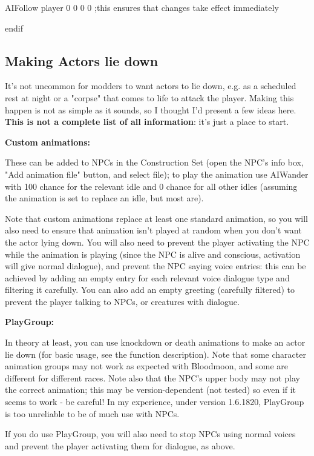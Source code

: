 \documentclass[
]{article}
\begin{document}
AIFollow player 0 0 0 0 ;this ensures that changes take effect
immediately

endif

\hypertarget{making-actors-lie-down}{%
\subsection{Making Actors lie down}\label{making-actors-lie-down}}

It's not uncommon for modders to want actors to lie down, e.g. as a
scheduled rest at night or a "corpse" that comes to life to attack the
player. Making this happen is not as simple as it sounds, so I thought
I'd present a few ideas here. \textbf{This is not a complete list of all
information}: it's just a place to start.

\textbf{Custom animations:}

These can be added to NPCs in the Construction Set (open the NPC's info
box, "Add animation file" button, and select file); to play the
animation use AIWander with 100 chance for the relevant idle and 0
chance for all other idles (assuming the animation is set to replace an
idle, but most are).

Note that custom animations replace at least one standard animation, so
you will also need to ensure that animation isn't played at random when
you don't want the actor lying down. You will also need to prevent the
player activating the NPC while the animation is playing (since the NPC
is alive and conscious, activation will give normal dialogue), and
prevent the NPC saying voice entries: this can be achieved by adding an
empty entry for each relevant voice dialogue type and filtering it
carefully. You can also add an empty greeting (carefully filtered) to
prevent the player talking to NPCs, or creatures with dialogue.

\textbf{PlayGroup:}

In theory at least, you can use knockdown or death animations to make an
actor lie down (for basic usage, see the function description). Note
that some character animation groups may not work as expected with
Bloodmoon, and some are different for different races. Note also that
the NPC's upper body may not play the correct animation; this may be
version-dependent (not tested) so even if it seems to work - be careful!
In my experience, under version 1.6.1820, PlayGroup is too unreliable to
be of much use with NPCs.

If you do use PlayGroup, you will also need to stop NPCs using normal
voices and prevent the player activating them for dialogue, as above.
\end{document}

